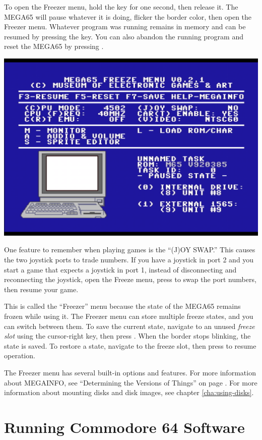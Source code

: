 To open the Freezer menu, hold the  key for one second, then release it. The MEGA65 will pause whatever it is doing, flicker the border color, then open the Freezer menu. Whatever program was running remains in memory and can be resumed by pressing the  key. You can also abandon the running program and reset the MEGA65 by pressing .

\begin{center}
  \includegraphics[width=0.7\linewidth]{images/freezer.png}
\end{center}

One feature to remember when playing games is the ``(J)OY SWAP.'' This causes the two joystick ports to trade numbers. If you have a joystick in port 2 and you start a game that expects a joystick in port 1, instead of disconnecting and reconnecting the joystick, open the Freeze menu, press  to swap the port numbers, then resume your game.

This is called the ``Freezer'' menu because the state of the MEGA65 remains frozen while using it. The Freezer menu can store multiple freeze states, and you can switch between them. To save the current state, navigate to an unused {\it freeze slot} using the cursor-right key, then press . When the border stops blinking, the state is saved. To restore a state, navigate to the freeze slot, then press  to resume operation.

The Freezer menu has several built-in options and features. For more information about MEGAINFO, see ``Determining the Versions of Things'' on page \pageref{sec:versions}. For more information about mounting disks and disk images, see chapter \vref{cha:using-disks}.


\section{Running Commodore 64 Software}

